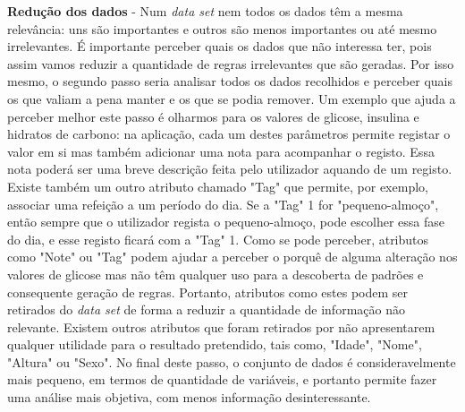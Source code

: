 \textbf{Redução dos dados} - Num \textit{data set} nem todos os dados têm a mesma relevância: uns são importantes e outros são menos importantes ou até mesmo irrelevantes. É importante perceber quais os dados que não interessa ter, pois assim vamos reduzir a quantidade de regras irrelevantes que são geradas. Por isso mesmo, o segundo passo seria analisar todos os dados recolhidos e perceber quais os que valiam a pena manter e os que se podia remover. Um exemplo que ajuda a perceber melhor este passo é olharmos para os valores de glicose, insulina e hidratos de carbono: na aplicação, cada um destes parâmetros permite registar o valor em si mas também adicionar uma nota para acompanhar o registo. Essa nota poderá ser uma breve descrição feita pelo utilizador aquando de um registo. Existe também um outro atributo chamado "Tag" que permite, por exemplo, associar uma refeição a um período do dia. Se a "Tag" 1 for "pequeno-almoço", então sempre que o utilizador regista o pequeno-almoço, pode escolher essa fase do dia, e esse registo ficará com a "Tag" 1. Como se pode perceber, atributos como "Note" ou "Tag" podem ajudar a perceber o porquê de alguma alteração nos valores de glicose mas não têm qualquer uso para a descoberta de padrões e consequente geração de regras. Portanto, atributos como estes podem ser retirados do \textit{data set} de forma a reduzir a quantidade de informação não relevante. Existem outros atributos que foram retirados por não apresentarem qualquer utilidade para o resultado pretendido, tais como, "Idade", "Nome", "Altura" ou "Sexo". 
No final deste passo, o conjunto de dados é consideravelmente mais pequeno, em termos de quantidade de variáveis, e portanto permite fazer uma análise mais objetiva, com menos informação desinteressante.

